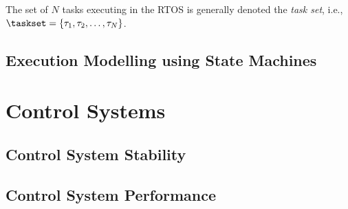 The set of $N$ tasks executing in the RTOS is generally denoted the \emph{task set}, i.e., $\taskset = \left\{ \tau_1, \tau_2, \ldots, \tau_N \right\}$.




\subsection{Execution Modelling using State Machines}%
\label{sec:background:fsm}%
%


\section{Control Systems}%
\label{sec:background:ctrl}%
%

\subsection{Control System Stability}%
\label{sec:background:stability}%
%

\subsection{Control System Performance}%
\label{sec:background:performance}%
%


